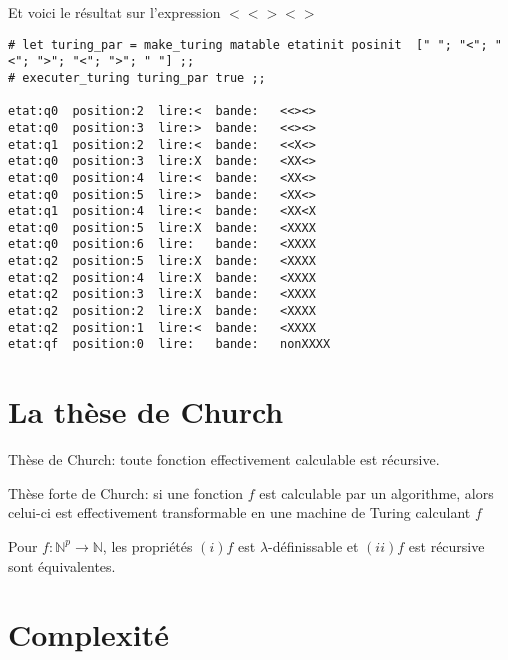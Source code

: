 Et voici le résultat sur l'expression $ <<><> $
\begin{Verbatim}
# let turing_par = make_turing matable etatinit posinit  [" "; "<"; "<"; ">"; "<"; ">"; " "] ;;
# executer_turing turing_par true ;;

etat:q0  position:2  lire:<  bande:   <<><> 
etat:q0  position:3  lire:>  bande:   <<><> 
etat:q1  position:2  lire:<  bande:   <<X<> 
etat:q0  position:3  lire:X  bande:   <XX<> 
etat:q0  position:4  lire:<  bande:   <XX<> 
etat:q0  position:5  lire:>  bande:   <XX<> 
etat:q1  position:4  lire:<  bande:   <XX<X 
etat:q0  position:5  lire:X  bande:   <XXXX 
etat:q0  position:6  lire:   bande:   <XXXX  
etat:q2  position:5  lire:X  bande:   <XXXX  
etat:q2  position:4  lire:X  bande:   <XXXX  
etat:q2  position:3  lire:X  bande:   <XXXX  
etat:q2  position:2  lire:X  bande:   <XXXX  
etat:q2  position:1  lire:<  bande:   <XXXX  
etat:qf  position:0  lire:   bande:   nonXXXX  
\end{Verbatim}
\section{La thèse de Church}
\begin{theoreme}
	Thèse de Church: toute fonction effectivement calculable est récursive.
\end{theoreme}
\begin{theoreme}
	Thèse forte de Church: si une fonction $f$ est calculable par un algorithme, 
	alors celui-ci est effectivement transformable en une machine de Turing 
	calculant $f$
\end{theoreme}
\begin{theoreme}
  Pour $f:\mathbb{N}^p \rightarrow \mathbb{N}$, les propriétés $(i) f$ est $\lambda$-définissable et 
  $(ii) f$ est récursive sont équivalentes.
\end{theoreme}

\section{Complexité}
